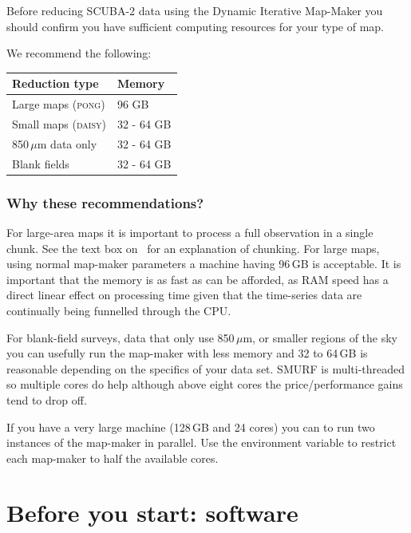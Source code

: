 \documentclass[11pt,oneside,chapters]{starlink}
\begin{document}
Before reducing SCUBA-2 data using the Dynamic Iterative Map-Maker you should confirm you have sufficient computing resources for your type of map.

We recommend the following:
\begin{table}[h!]
  \centering
  \begin{tabular}{ll}
    \hline
    \textbf{Reduction type} &\textbf{Memory} \\
    \hline
    Large maps (\textsc{pong})& 96 GB\\
    Small maps (\textsc{daisy})&32 - 64 GB\\
    850\,$\mu$m data only&32 - 64 GB\\
    Blank fields&32 - 64 GB\\
    \hline
  \end{tabular}
\end{table}

\subsubsection*{Why these recommendations?}

For large-area maps it is important to process a full observation in a
single chunk. See the text box on
\
for an explanation of chunking. For large maps, using normal map-maker
parameters a machine having 96\,GB is acceptable. It is important that
the memory is as fast as can be afforded, as RAM speed has a direct
linear effect on processing time given that the time-series data are
continually being funnelled through the CPU.

For blank-field surveys, data that only use 850\,$\mu$m, or smaller
regions of the sky you can usefully run the map-maker with less memory
and 32 to 64\,GB is reasonable depending on the specifics of your data
set. SMURF is multi-threaded so multiple cores do help although above
eight cores the price/performance gains tend to drop off.

If you have a very large machine (128\,GB and 24 cores) you can to run
two instances of the map-maker in parallel. Use the 
environment variable to restrict each map-maker to half the available
cores.


\section{Before you start: software}
\end{document}

